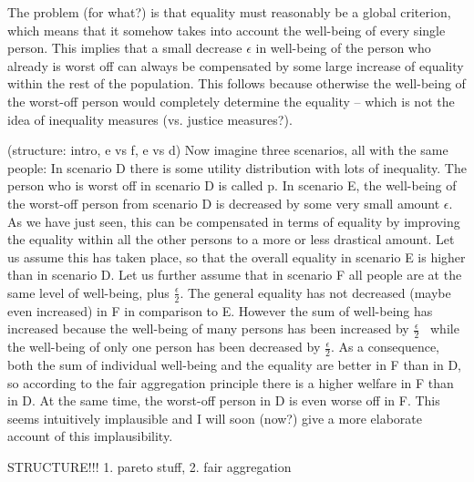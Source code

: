 The problem (for what?) is that equality must reasonably be a global criterion, which means that it somehow takes into account the well-being of every single person. This implies that a small decrease $\epsilon $ in well-being of the person who already is worst off can always be compensated by some large increase of equality within the rest of the population. This follows because otherwise the well-being of the worst-off person would completely determine the equality – which is not the idea of inequality measures (vs. justice measures?).  

(structure: intro, e vs f, e vs d) Now imagine three scenarios, all with the same people: In scenario D there is some utility distribution with lots of inequality. The person who is worst off in scenario D is called p. In scenario E, the well-being of the worst-off person from scenario D is decreased by some very small amount $\epsilon $. As we have just seen, this can be compensated in terms of equality by improving the equality within all the other persons to a more or less drastical amount. Let us assume this has taken place, so that the overall equality in scenario E is higher than in scenario D. Let us further assume that in scenario F all people are at the same level of well-being, plus  $\frac{\epsilon}{2}$. The general equality has not decreased (maybe even increased) in F in comparison to E. However the sum of well-being has increased because the well-being of many persons has been increased by  $\frac{\epsilon}{2}$ \ while the well-being of only one person has been decreased by  $\frac{\epsilon}{2}$. As a consequence, both the sum of individual well-being and the equality are better in F than in D, so according to the fair aggregation principle there is a higher welfare in F than in D. At the same time, the worst-off person in D is even worse off in F. This seems intuitively implausible and I will soon (now?) give a more elaborate account of this implausibility.  

STRUCTURE!!! 1. pareto stuff, 2. fair aggregation 

